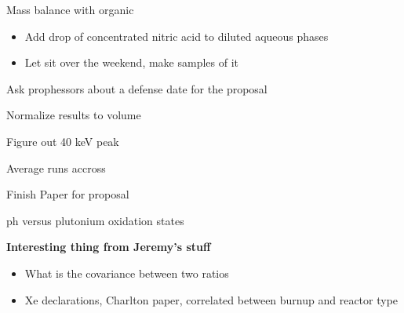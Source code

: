 \documentclass[idxtotoc,hyperref,openany,oneside]{labbook} %
\newcommand{\cmark}{\ding{51}}%
\newcommand{\done}{\rlap{$\square$}{\raisebox{2pt}{\large\hspace{1pt}\cmark}}%
  \hspace{-2.5pt}}
\begin{document}
\begin{todolist}
\item{Mass balance with organic \frownie}
  \begin{itemize}
  \item{Add drop of concentrated nitric acid to diluted aqueous phases}
  \item{Let sit over the weekend, make samples of it}
  \end{itemize}
\item[\done]{Ask prophessors about a defense date for the proposal}
\item{Normalize results to volume}
\item{Figure out 40 keV peak}
\item{Average runs accross}
\item{Finish Paper for proposal}
\item{ph versus plutonium oxidation states}
\end{todolist}
\textbf{Interesting thing from Jeremy's stuff}
\begin{itemize}
\item{What is the covariance between two ratios}
\item{Xe declarations, Charlton paper, correlated between burnup and reactor type}
\end{itemize}
\end{document}
